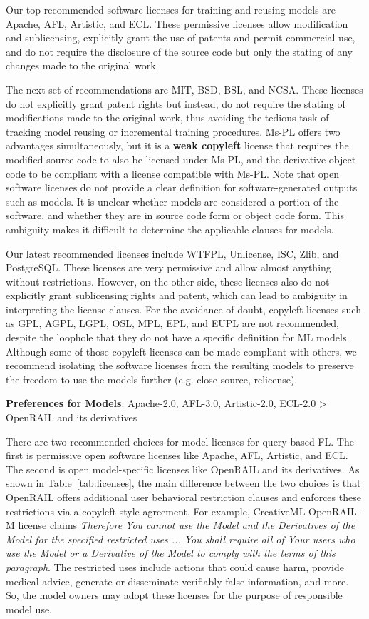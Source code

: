   Our top recommended software licenses for training and reusing models are Apache, AFL, Artistic, and ECL.
  These permissive licenses allow modification and sublicensing, explicitly grant the use of patents and permit commercial use, and do not require the disclosure of the source code but only the stating of any changes made to the original work.

  The next set of recommendations are MIT, BSD, BSL, and NCSA. 
  These licenses do not explicitly grant patent rights but instead, do not require the stating of modifications made to the original work, thus avoiding the tedious task of tracking model reusing or incremental training procedures. 
  Ms-PL offers two advantages simultaneously, but it is a \textbf{weak copyleft} license that requires the modified source code to also be licensed under Ms-PL, and the derivative object code to be compliant with a license compatible with Ms-PL.
  Note that open software licenses do not provide a clear definition for software-generated outputs such as models. 
  It is unclear whether models are considered a portion of the software, and whether they are in source code form or object code form. 
  This ambiguity makes it difficult to determine the applicable clauses for models.
  
  Our latest recommended licenses include WTFPL, Unlicense, ISC, Zlib, and PostgreSQL.
  These licenses are very permissive and allow almost anything without restrictions.
  However, on the other side, these licenses also do not explicitly grant sublicensing rights and patent, which can lead to ambiguity in interpreting the license clauses.
  For the avoidance of doubt, copyleft licenses such as GPL, AGPL, LGPL, OSL, MPL, EPL, and EUPL are not recommended, despite the loophole that they do not have a specific definition for ML models.
  Although some of those copyleft licenses can be made compliant with others, we recommend isolating the software licenses from the resulting models to preserve the freedom to use the models further (e.g. close-source, relicense).
  
  \textbf{Preferences for Models}: Apache-2.0, AFL-3.0, Artistic-2.0, ECL-2.0 > OpenRAIL and its derivatives
  
  There are two recommended choices for model licenses for query-based FL. 
  The first is permissive open software licenses like Apache, AFL, Artistic, and ECL. 
  The second is open model-specific licenses like OpenRAIL and its derivatives.
  As shown in Table~\ref{tab:licenses}, the main difference between the two choices is that OpenRAIL offers additional user behavioral restriction clauses and enforces these restrictions via a copyleft-style agreement.
  For example, CreativeML OpenRAIL-M license claims \textit{Therefore You cannot use the Model and the Derivatives of the Model for the specified restricted uses ... You shall require all of Your users who use the Model or a Derivative of the Model to comply with the terms of this paragraph}.
  The restricted uses include actions that could cause harm, provide medical advice, generate or disseminate verifiably false information, and more.
  So, the model owners may adopt these licenses for the purpose of responsible model use.

